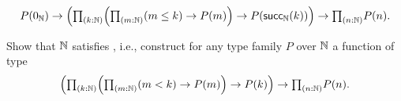 \begin{exercises}
\begin{subexenum}
    \begin{equation*}
      P(\zeroN) \to \Big(\prd{k:\N}\Big(\prd{m:\N} (m\leq k) \to P(m)\Big)\to P(\succN(k))\Big) \to \prd{n:\N}P(n).
    \end{equation*}
  \item Show that $\mathbb{N}$ satisfies , i.e., construct for any type family $P$ over $\mathbb{N}$ a function of type
    \begin{equation*}
      \Big(\prd{k:\N} \Big(\prd{m:\N} (m< k) \to P(m)\Big)\to P(k)\Big) \to \prd{n:\N}P(n).
    \end{equation*}
  \end{subexenum}
\end{exercises}
